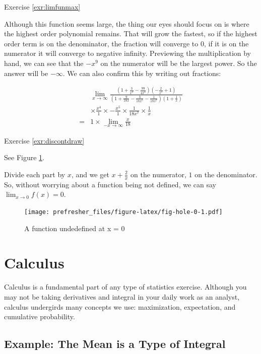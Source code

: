 \documentclass[]{book}
\theoremstyle{definition}
\theoremstyle{definition}
\theoremstyle{definition}
\theoremstyle{remark}
\begin{document}
Exercise \ref{exr:limfunmax}

{}Although this function seems large, the thing our eyes should focus on is where the highest order polynomial remains. That will grow the fastest, so if the highest order term is on the denominator, the fraction will converge to 0, if it is on the numerator it will converge to negative infinity. Previewing the multiplication by hand, we can see that the \(-x^9\) on the numerator will be the largest power. So the answer will be \(-\infty\). We can also confirm this by writing out fractions:

\begin{align*}  
& \lim_{x\to\infty}\frac{\left(1 + \frac{3}{x^3} - \frac{99}{4x^4}\right)\left(-\frac{2}{x^5} + 1\right)}{\left(1 + \frac{9}{18x} - \frac{3}{18x^5} - \frac{1}{18x^7} \right)\left(1 + \frac{1}{x}\right)} \\
&\times \frac{x^4}{1} \times -\frac{x^5}{1} \times \frac{1}{18x^7}\times \frac{1}{x}\\
=& 1 \times \lim_{-x\to\infty} \frac{x}{18}
\end{align*}

Exercise \ref{exr:discontdraw}

{}
See Figure \ref{fig:fig-hole-0}.

Divide each part by \(x\), and we get \(x + \frac{2}{x}\) on the numerator, \(1\) on the denominator. So, without worrying about a function being not defined, we can say \(\lim_{x\to 0}f(x) = 0\).

\begin{figure}
\centering
\texttt{[image: prefresher\_files/figure-latex/fig-hole-0-1.pdf]}
\caption{\label{fig:fig-hole-0}A function undedefined at x = 0}
\end{figure}

\hypertarget{derivatives}{%
\chapter{Calculus}\label{derivatives}}

Calculus is a fundamental part of any type of statistics exercise. Although you may not be taking derivatives and integral in your daily work as an analyst, calculus undergirds many concepts we use: maximization, expectation, and cumulative probability.

\hypertarget{example-the-mean-is-a-type-of-integral}{%
\section*{Example: The Mean is a Type of Integral}\label{example-the-mean-is-a-type-of-integral}}
\end{document}
